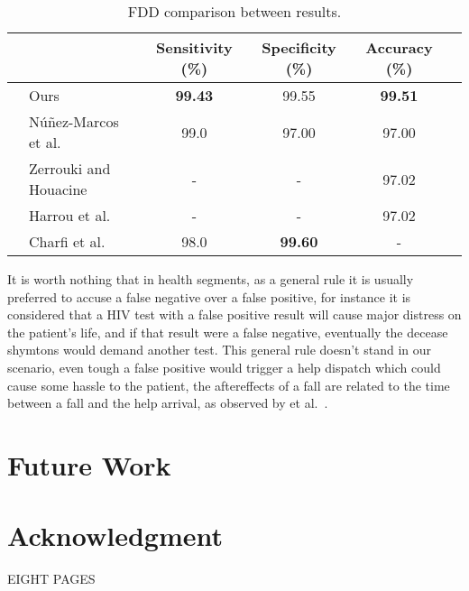 \documentclass[conference]{IEEEtran}
\begin{document}
\begin{table*}[t]
\centering
\caption{FDD comparison between results.}
\label{tab:fdd-our-their}
\begin{tabular}{llcccl}
\hline
 &                          & Sensitivity (\%)  & Specificity (\%)  & Accuracy (\%)     & \\ \hline
 & Ours                     & \textbf{99.43}    & 99.55             & \textbf{99.51}    & \\
 & N\'u\~nez-Marcos et al.~\cite{nunez2017vision}  & 99.0              & 97.00             & 97.00             & \\
 & Zerrouki and Houacine~\cite{zerrouki2018vision}    & -                 & -                 & 97.02             & \\
 & Harrou et al.~\cite{harrou2017vision}    & -                 & -                 & 97.02             & \\
 & Charfi et al.~\cite{charfi2013optimised}            & 98.0              & \textbf{99.60}    & -                 & \\ \hline
\end{tabular}
\end{table*}

 It is worth nothing that in health segments, as a general rule it is usually preferred to accuse a false negative over a false positive, for instance it is considered that a HIV test with a false positive result will cause major distress on the patient's life, and if that result were a false negative, eventually the decease shymtons would demand another test. This general rule doesn't stand in our scenario, even tough a false positive would trigger a help dispatch which could cause some hassle to the patient, the aftereffects of a fall are related to the time between a fall and the help arrival, as observed by et al.~\cite{}.
 
\section{Future Work}



\section*{Acknowledgment}

\begin{thebibliography}{00}
\end{thebibliography}

\color{red}
\centering
EIGHT PAGES
\end{document}
